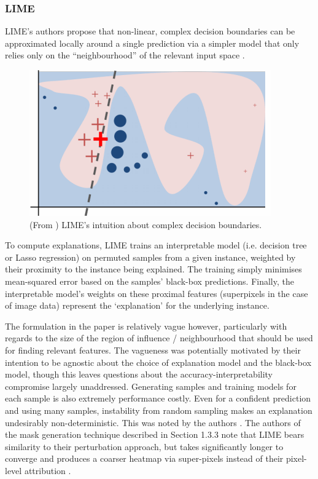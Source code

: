 \documentclass[main]{subfiles}
\begin{document}
\subsubsection{LIME}
LIME's authors propose that non-linear, complex decision boundaries can be approximated locally around a single prediction via a simpler model that only relies only on the ``neighbourhood'' of the relevant input space \cite{lime}. 

\begin{figure}[h]
\centering
\includegraphics[scale=0.65]{lime_figure.png}
\caption{(From \cite{lime}) LIME's intuition about complex decision boundaries.}
\label{limeimg}
\end{figure}

To compute explanations, LIME trains an interpretable model (i.e. decision tree or Lasso regression) on permuted samples from a given instance, weighted by their proximity to the instance being explained. The training simply minimises mean-squared error based on the samples' black-box predictions. Finally, the interpretable model's weights on these proximal features (superpixels in the case of image data) represent the `explanation' for the underlying instance. 

The formulation in the paper is relatively vague however, particularly with regards to the size of the region of influence / neighbourhood that should be used for finding relevant features. The vagueness was potentially motivated by their intention to be agnostic about the choice of explanation model and the black-box model, though this leaves questions about the accuracy-interpretability compromise largely unaddressed. Generating samples and training models for each sample is also extremely performance costly. Even for a confident prediction and using many samples, instability from random sampling makes an explanation undesirably non-deterministic. This was noted by the authors \cite{lime}. The authors of the mask generation technique described in Section 1.3.3 note that LIME bears similarity to their perturbation approach, but takes significantly longer to converge and produces a coarser heatmap via super-pixels instead of their pixel-level attribution \cite{perturb_fong}.
\end{document}
